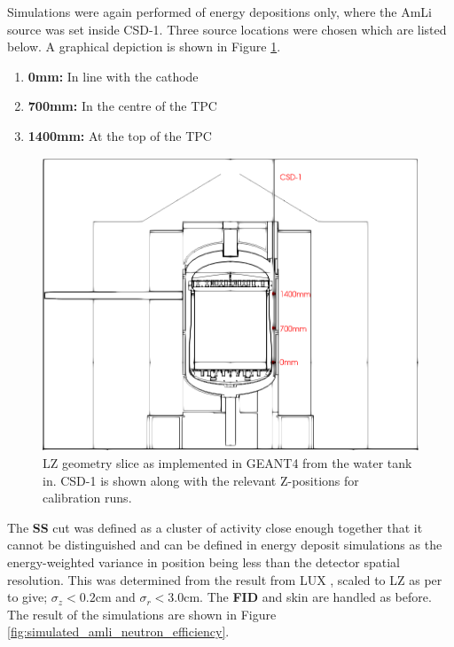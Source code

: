 

\par
Simulations were again performed of energy depositions only, where the AmLi source was set inside CSD-1.
Three source locations were chosen which are listed below. A graphical depiction is shown in Figure \ref{fig:CSD1_Geometry}. 
\begin{enumerate}
    \item \textbf{0mm:} In line with the cathode
    \item \textbf{700mm:} In the centre of the TPC
    \item \textbf{1400mm:} At the top of the TPC
\end{enumerate}

\begin{figure}[!htbp]
\centering
\includegraphics[width=\textwidth]{Figures/Geometry/csd1_geometry_black_and_white.png}
\caption{LZ geometry slice as implemented in GEANT4 from the water tank in. CSD-1 is shown along with the relevant Z-positions for calibration runs.}
\label{fig:CSD1_Geometry}
\end{figure}


\par
The \textbf{SS} cut was defined as a cluster of activity close enough together that it cannot be distinguished and can be defined in energy deposit simulations as the energy-weighted variance in position being less than the detector spatial resolution.
This was determined from the result from LUX \cite{lux_position_reconstruction_ref}, scaled to LZ as per \cite{LZ_TechnicalDesignReview_ref} to give; ${\sigma}_{z}<0.2$cm and ${\sigma}_{r}<3.0$cm.
The \textbf{FID} and skin are handled as before.
The result of the simulations are shown in Figure \ref{fig:simulated_amli_neutron_efficiency}.


